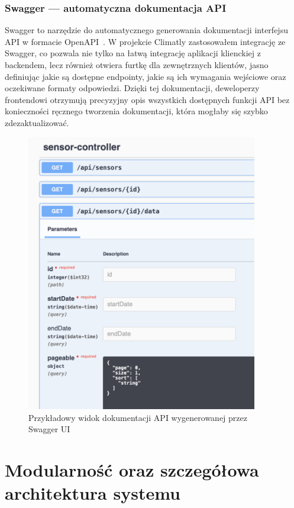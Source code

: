 \documentclass[a4paper,12pt,openany]{book}
\begin{document}
\subsection*{Swagger --- automatyczna dokumentacja API}

Swagger to narzędzie do automatycznego generowania dokumentacji interfejsu API w formacie OpenAPI~\cite{bib:swagger2023}. W projekcie Climatly zastosowałem integrację ze Swagger, co pozwala nie tylko na łatwą integrację aplikacji klienckiej z backendem, lecz również otwiera furtkę dla zewnętrznych klientów, jasno definiując jakie są dostępne endpointy, jakie są ich wymagania wejściowe oraz oczekiwane formaty odpowiedzi. Dzięki tej dokumentacji, deweloperzy frontendowi otrzymują precyzyjny opis wszystkich dostępnych funkcji API bez konieczności ręcznego tworzenia dokumentacji, która mogłaby się szybko zdezaktualizować.

\begin{figure}[H]
    \centering
    \includegraphics[width=0.9\textwidth]{swagger.png}
    \caption{Przykładowy widok dokumentacji API wygenerowanej przez Swagger UI}
    \label{fig:swagger-ui}
\end{figure}

\chapter{Modularność oraz szczegółowa architektura systemu}
\end{document}
